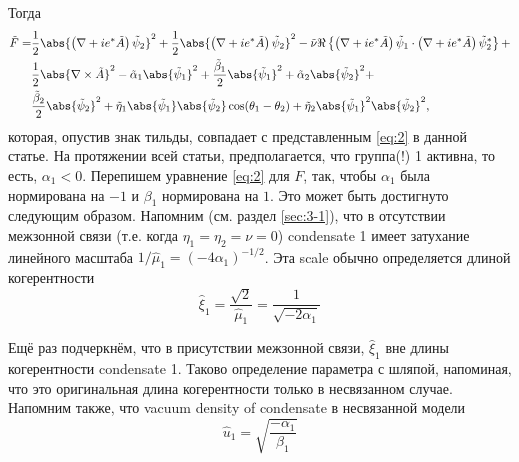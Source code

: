 Тогда
\begin{align}
	\tilde{F} = & \frac{1}{2}\abs{\left( \nabla + ie^*\tilde{A} \right)
	  \tilde{\psi}_2}^2 + \frac{1}{2}\abs{\left( \nabla + ie^*\tilde{A} \right)
	  \tilde{\psi}_2}^2 - \tilde{\nu} \Re\left\{ \left( \nabla + ie^*\tilde{A}
	  \right)\tilde{\psi}_1 \cdot \left( \nabla + ie^*\tilde{A} \right)
	  \tilde{\psi}^*_2 \right\} + \nonumber \\
	& \frac{1}{2}\abs{\nabla\times\tilde{A}}^2 - \tilde{\alpha}_1
	  \abs{\tilde{\psi}_1}^2 + \frac{\tilde{\beta}_1}{2}\abs{\tilde{\psi}_1}^2 +
		\tilde{\alpha}_2\abs{\tilde{\psi}_2}^2 + \nonumber \\
  & \frac{\tilde{\beta}_2}{2}\abs{\tilde{\psi}_2}^2 + \tilde{\eta}_1
		\abs{\tilde{\psi}_1}\abs{\tilde{\psi}_2}\cos(\theta_1 - \theta_2) +
		\tilde{\eta}_2\abs{\tilde{\psi}_1}^2 \abs{\tilde{\psi}_2}^2, \label{eq:A-3}
\end{align}
которая, опустив знак тильды, совпадает с представленным \eqref{eq:2} в
данной статье. На протяжении всей статьи, предполагается, что группа(!) 1
активна, то есть, \( \alpha_1 < 0 \). Перепишем уравнение \eqref{eq:2} для
\( F \), так, чтобы \( \alpha_1 \) была нормирована на \( -1 \) и
\( \beta_1 \) нормирована на \( 1 \). Это может быть достигнуто следующим
образом. Напомним (см. раздел \ref{sec:3-1}), что в отсутствии межзонной связи (т.е.
когда \( \eta_1 = \eta_2 = \nu = 0 \)) condensate 1 имеет затухание линейного
масштаба \( 1/\hat{\mu}_1 = (-4\alpha_1)^{-1/2} \). Эта scale обычно
определяется длиной когерентности
\begin{equation}
	\hat{\xi}_1 = \frac{\sqrt{2}}{\hat{\mu}_1} = \frac{1}{\sqrt{-2\alpha_1}}
	\label{eq:A-4}
\end{equation}

Ещё раз подчеркнём, что в присутствии межзонной связи, \( \hat{\xi}_1 \) вне
длины когерентности condensate 1. Таково определение параметра с шляпой,
напоминая, что это оригинальная длина когерентности только в несвязанном
случае. Напомним также, что vacuum density of condensate в несвязанной модели
\begin{equation}
	\hat{u}_1 = \sqrt{\frac{-\alpha_1}{\beta_1}}
	\label{eq:A-5}
\end{equation}

